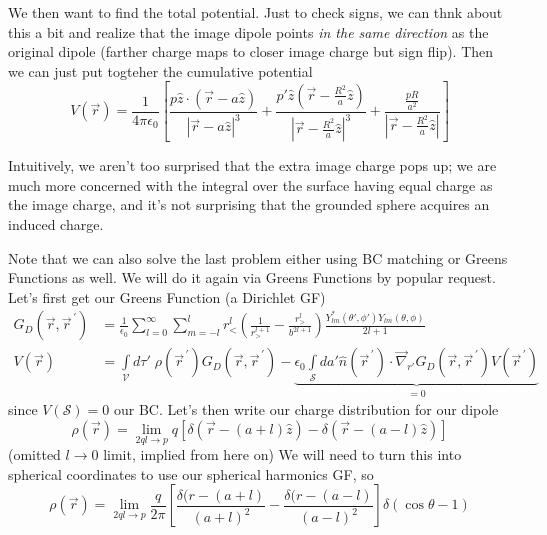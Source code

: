 \documentclass[10pt]{report}
\newcommand{\pvec}[1]{\vec{#1}^{\,\prime}}
\newcommand{\abs}[1]{\left|#1\right|}
\begin{document}
We then want to find the total potential. Just to check signs, we can thnk about this a bit and realize that the image dipole points \emph{in the same direction} as the original dipole (farther charge maps to closer image charge but sign flip). Then we can just put togteher the cumulative potential
\begin{equation}
    V(\vec{r}) = \frac{1}{4\pi\epsilon_0}\left[ \frac{p\hat{z}\cdot \left( \vec{r} - a\hat{z} \right)}{\abs{\vec{r} - a\hat{z}}^3} + \frac{p'\hat{z}\left( \vec{r} - \frac{R^2}{a}\hat{z} \right)}{\abs{\vec{r} - \frac{R^2}{a}\hat{z}}^3} + \frac{\frac{pR}{a^2}}{\abs{\vec{r} - \frac{R^2}{a}\hat{z}}} \right]
\end{equation}

Intuitively, we aren't too surprised that the extra image charge pops up; we are much more concerned with the integral over the surface having equal charge as the image charge, and it's not surprising that the grounded sphere acquires an induced charge.

Note that we can also solve the last problem either using BC matching or Greens Functions as well. We will do it again via Greens Functions by popular request. Let's first get our Greens Function (a Dirichlet GF)
\begin{align}
    G_D(\vec{r}, \pvec{r}) &= \frac{1}{\epsilon_0} \sum_{l=0}^{\infty}\sum_{m=-l}^{l}r_<^l\left( \frac{1}{r_>^{l+1}} - \frac{r_>^l}{b^{2l+1}} \right) \frac{Y_{lm}^*(\theta', \phi')Y_{lm}(\theta,\phi)}{2l+1}\\
    V(\vec{r}) &= \displaystyle\int\limits_{\mathcal{V}}^{}d\tau'\;\rho(\pvec{r})G_D(\vec{r}, \pvec{r}) - \underbrace{\epsilon_0\displaystyle\int\limits_{\mathcal{S}}^{}da'\hat{n}(\pvec{r})\cdot \vec{\nabla}_{r'}G_D(\vec{r}, \pvec{r})V(\pvec{r})}_{ = 0}\label{3.13.V}
\end{align}
since $V(\mathcal{S}) = 0$ our BC. Let's then write our charge distribution for our dipole
\begin{equation}
    \rho(\vec{r}) = \lim_{2ql \to p}q\left[ \delta(\vec{r} - (a+l)\hat{z}) - \delta(\vec{r} - (a-l)\hat{z}) \right]
\end{equation}
(omitted $l \to 0$ limit, implied from here on) We will need to turn this into spherical coordinates to use our spherical harmonics GF, so
\begin{equation}
    \rho(\vec{r}) = \lim_{2ql \to p}\frac{q}{2\pi}\left[ \frac{\delta(r - (a + l)}{(a+l)^2} - \frac{\delta(r - (a - l)}{(a - l)^2} \right]\delta(\cos\theta - 1)
\end{equation}
\end{document}
